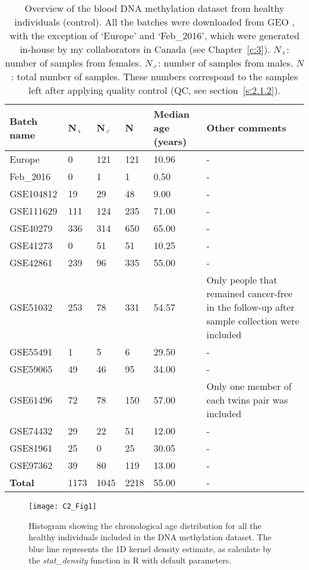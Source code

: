 \begin{table}
\small
	\begin{tabular}{ p{2cm} p{1cm} p{1cm} p{1cm} p{2cm} p{6cm} }
		\toprule
		\textbf{Batch name} & \textbf{N$_{\female}$} & \textbf{N$_{\male}$} & \textbf{N} & \textbf{Median age (years)} & \textbf{Other comments} \\
		\midrule
		Europe & 0 & 121 & 121 & 10.96 & - \\
		Feb\_2016 & 0 & 1 & 1 & 0.50 & - \\
		GSE104812 & 19 & 29 & 48 & 9.00 & - \\
		GSE111629 & 111 & 124 & 235 &  71.00 & - \\
		GSE40279 & 336 & 314 & 650 & 65.00 & - \\
		GSE41273 & 0 & 51 & 51 & 10.25 & - \\
		GSE42861 & 239 & 96 & 335 & 55.00 & - \\
		GSE51032 & 253 & 78 & 331 & 54.57 & Only people that remained cancer-free in the follow-up after sample collection were included  \\
		GSE55491 & 1 & 5 & 6 & 29.50 & - \\
		GSE59065 & 49 & 46 & 95 & 34.00 & - \\
		GSE61496 & 72 & 78 & 150 & 57.00 & Only one member of each twins pair was included \\
		GSE74432 & 29 & 22 & 51 & 12.00 & - \\
		GSE81961 & 25 & 0 & 25 & 30.05 & - \\
		GSE97362 & 39 & 80 & 119 & 13.00 & - \\
		\midrule
		\textbf{Total} & 1173 & 1045 & 2218 & 55.00 & - \\ 
		\bottomrule
	\end{tabular}
	\vspace*{3mm}
	\caption[Overview of the blood DNA methylation dataset from healthy individuals]{Overview of the blood DNA methylation dataset from healthy individuals (control). All the batches were downloaded from GEO \citep{Edgar2002}, with the exception of `Europe' and `Feb\_2016', which were generated in-house by my collaborators in Canada (see Chapter~\ref{c:3}). $N_{\female}$: number of samples from females. $N_{\male}$: number of samples from males. $N$: total number of samples. These numbers correspond to the samples left after applying quality control (QC, see section~\ref{s:2.1.2}).}
	\label{table:c2_table1}
\end{table} 


\begin{figure}[htbp!] 
	\centering    
	\texttt{[image: C2\_Fig1]}
	\vspace*{2mm}
	\caption[Chronological age distribution in the healthy individuals]{Histogram showing the chronological age distribution for all the healthy individuals included in the DNA methylation dataset. The blue line represents the 1D kernel density estimate, as calculate by the \textit{stat\_density} function in R with default parameters.}
	\label{fig:c2_fig1}
\end{figure}

